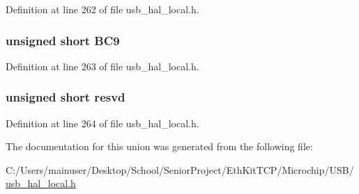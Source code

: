 Definition at line 262 of file usb\+\_\+hal\+\_\+local.\+h.

\hypertarget{union___b_y_t_e_c_o_u_n_t_a641cf1be1a1607146c77efef0b75bbe9}{}
\subsubsection[{B\+C9}]{\setlength{\rightskip}{0pt plus 5cm}unsigned short B\+C9}\label{union___b_y_t_e_c_o_u_n_t_a641cf1be1a1607146c77efef0b75bbe9}


Definition at line 263 of file usb\+\_\+hal\+\_\+local.\+h.

\hypertarget{union___b_y_t_e_c_o_u_n_t_ae3dc0e4d24d0518699d8f081ba58f91c}{}
\subsubsection[{resvd}]{\setlength{\rightskip}{0pt plus 5cm}unsigned short resvd}\label{union___b_y_t_e_c_o_u_n_t_ae3dc0e4d24d0518699d8f081ba58f91c}


Definition at line 264 of file usb\+\_\+hal\+\_\+local.\+h.



The documentation for this union was generated from the following file\+:\begin{DoxyCompactItemize}
\item 
C\+:/\+Users/mainuser/\+Desktop/\+School/\+Senior\+Project/\+Eth\+Kit\+T\+C\+P/\+Microchip/\+U\+S\+B/\hyperlink{usb__hal__local_8h}{usb\+\_\+hal\+\_\+local.\+h}\end{DoxyCompactItemize}
